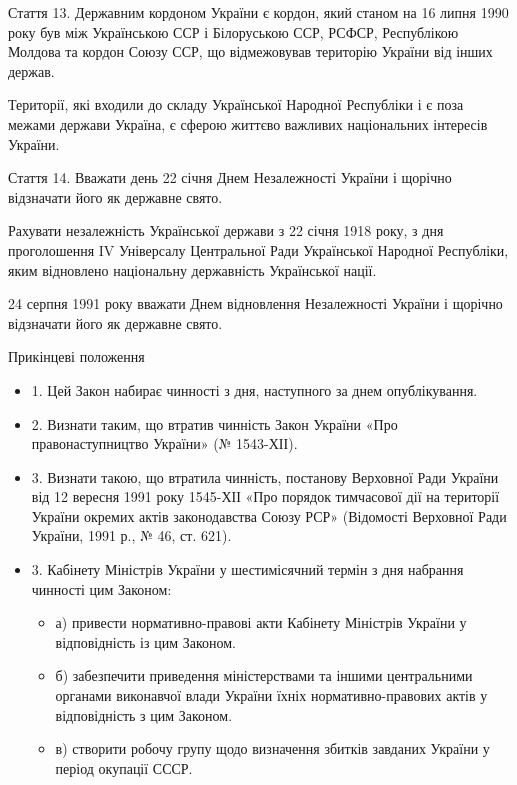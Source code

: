 Стаття 13. Державним кордоном України є кордон, який станом на 16 липня 1990
року був між Українською ССР і Білоруською ССР, РСФСР, Республікою Молдова та
кордон Союзу ССР, що відмежовував територію України від інших держав.

Території, які входили до складу Української Народної Республіки і є поза
межами держави Україна, є сферою життєво важливих національних інтересів
України.

Стаття 14. Вважати день 22 січня Днем Незалежності України і щорічно відзначати його як державне свято.

Рахувати незалежність Української держави з 22 січня 1918 року, з дня
проголошення IV Універсалу Центральної Ради Української Народної Республіки,
яким відновлено національну державність Української нації.

24 серпня 1991 року вважати Днем відновлення Незалежності України і щорічно відзначати його як державне свято.

Прикінцеві положення

\begin{itemize}
\item 1. Цей Закон набирає чинності з дня, наступного за днем опублікування.
\item 2. Визнати таким, що втратив чинність Закон України «Про правонаступництво України» (№ 1543-ХІІ).
\item 3. Визнати такою, що втратила чинність, постанову Верховної Ради України від 12 вересня 1991 року 1545-ХІІ «Про порядок тимчасової дії на території України окремих актів законодавства Союзу РСР» (Відомості Верховної Ради України, 1991 р., № 46, ст. 621).
\item 3. Кабінету Міністрів України у шестимісячний термін з дня набрання чинності цим Законом:

\begin{itemize}
  \item а) привести нормативно-правові акти Кабінету Міністрів України у відповідність із цим Законом.
  \item б) забезпечити приведення міністерствами та іншими центральними органами виконавчої влади України їхніх нормативно-правових актів у відповідність з цим Законом.
  \item в) створити робочу групу щодо визначення збитків завданих України у період окупації СССР.
\end{itemize}
\end{itemize}
